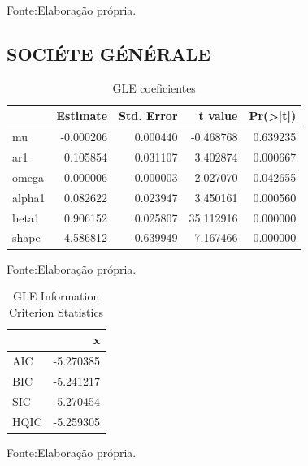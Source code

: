\documentclass[
  12pt,
  a4paper,
  openany]{book}
\begin{document}
Fonte:Elaboração própria.

\justifying
\bigskip

\hypertarget{sociuxe9te-guxe9nuxe9rale}{%
\subsection{SOCIÉTE GÉNÉRALE}\label{sociuxe9te-guxe9nuxe9rale}}

\begin{table}[!h]

\caption{\label{tab:unnamed-chunk-36}GLE coeficientes}
\centering
\begin{tabular}[t]{lrrrr}
\toprule
  &  Estimate &  Std. Error &  t value & Pr(>|t|)\\
\midrule
mu & -0.000206 & 0.000440 & -0.468768 & 0.639235\\
ar1 & 0.105854 & 0.031107 & 3.402874 & 0.000667\\
omega & 0.000006 & 0.000003 & 2.027070 & 0.042655\\
alpha1 & 0.082622 & 0.023947 & 3.450161 & 0.000560\\
beta1 & 0.906152 & 0.025807 & 35.112916 & 0.000000\\
\addlinespace
shape & 4.586812 & 0.639949 & 7.167466 & 0.000000\\
\bottomrule
\end{tabular}
\end{table}
\FloatBarrier
\centering

Fonte:Elaboração própria.

\justifying
\bigskip

\begin{table}[!h]

\caption{\label{tab:unnamed-chunk-37}GLE Information Criterion Statistics}
\centering
\begin{tabular}[t]{lr}
\toprule
  & x\\
\midrule
AIC & -5.270385\\
BIC & -5.241217\\
SIC & -5.270454\\
HQIC & -5.259305\\
\bottomrule
\end{tabular}
\end{table}
\FloatBarrier
\centering

Fonte:Elaboração própria.

\justifying
\bigskip
\end{document}
